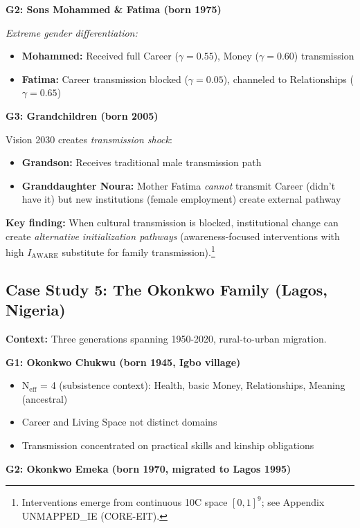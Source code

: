 \textbf{G2: Sons Mohammed \& Fatima (born 1975)}

\textit{Extreme gender differentiation:}
\begin{itemize}[nosep]
\item \textbf{Mohammed:} Received full Career ($\gamma = 0.55$), Money ($\gamma = 0.60$) transmission
\item \textbf{Fatima:} Career transmission blocked ($\gamma = 0.05$), channeled to Relationships ($\gamma = 0.65$)
\end{itemize}

\textbf{G3: Grandchildren (born 2005)}

Vision 2030 creates \textit{transmission shock}:
\begin{itemize}[nosep]
\item \textbf{Grandson:} Receives traditional male transmission path
\item \textbf{Granddaughter Noura:} Mother Fatima \textit{cannot} transmit Career (didn't have it)
      but new institutions (female employment) create external pathway
\end{itemize}

\textbf{Key finding:} When cultural transmission is blocked, institutional change can create
\textit{alternative initialization pathways} (awareness-focused interventions with high $I_{\text{AWARE}}$ substitute for family transmission).\footnote{Interventions emerge from continuous 10C space $[0,1]^9$; see Appendix UNMAPPED_IE (CORE-EIT).}

\subsection{Case Study 5: The Okonkwo Family (Lagos, Nigeria)}

\textbf{Context:} Three generations spanning 1950-2020, rural-to-urban migration.

\textbf{G1: Okonkwo Chukwu (born 1945, Igbo village)}
\begin{itemize}[nosep]
\item N$_{\text{eff}}$ = 4 (subsistence context): Health, basic Money, Relationships, Meaning (ancestral)
\item Career and Living Space not distinct domains
\item Transmission concentrated on practical skills and kinship obligations
\end{itemize}

\textbf{G2: Okonkwo Emeka (born 1970, migrated to Lagos 1995)}


